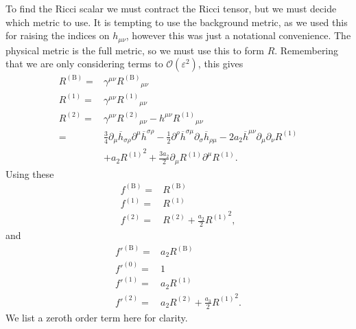 \documentclass[a4paper, 11pt, titlepage, twoside]{report}
\newcommand{\recip}[1]{\ensuremath{\frac{1}{#1}}}
\newcommand{\order}[1]{\ensuremath{\mathcal{O}({#1})}}
\begin{document}
To find the Ricci scalar we must contract the Ricci tensor, but we must decide which metric to use. It is tempting to use the background metric, as we used this for raising the indices on $h_{\mu\nu}$, however this was just a notational convenience. The physical metric is the full metric, so we must use this to form $R$. Remembering that we are only considering terms to $\order{\varepsilon^2}$, this gives
\begin{align}
R^{(\mathrm{B})} = {} & \gamma^{\mu\nu} {R^{(\mathrm{B})}}_{\mu\nu} \\
R^{(1)} = {} & \gamma^{\mu\nu} {R^{(1)}}_{\mu\nu} \\
R^{(2)} = {} & \gamma^{\mu\nu} {R^{(2)}}_{\mu\nu} - h^{\mu\nu} {R^{(1)}}_{\mu\nu} \nonumber \\
 = {} & \frac{3}{4}\partial_\mu\overline{h}_{\sigma\rho}\partial^\mu\overline{h}^{\sigma\rho} - \recip{2} \partial^\rho\overline{h}^{\sigma\mu}\partial_\sigma\overline{h}_{\rho\mu} - 2a_2 \overline{h}^{\mu\nu}\partial_\mu\partial_\nu R^{(1)} \nonumber \\
 & + {} a_2 {R^{(1)}}^2 + \frac{3a_2}{2}\partial_\mu R^{(1)} \partial^\mu R^{(1)}.
\end{align}
Using these
\begin{align}
f^{(\mathrm{B})} = {} & R^{(\mathrm{B})} \\
f^{(1)} = {} & R^{(1)} \\
f^{(2)} = {} & R^{(2)} + \frac{a_2}{2}{R^{(1)}}^2,
\end{align}
and
\begin{align}
f'^{(\mathrm{B})} = {} & a_2 R^{(\mathrm{B})} \\
f'^{(0)} = {} & 1 \\
f'^{(1)} = {} & a_2 R^{(1)} \\
f'^{(2)} = {} & a_2 R^{(2)} + \frac{a_3}{2}{R^{(1)}}^2.
\end{align}
We list a zeroth order term here for clarity.
\end{document}
